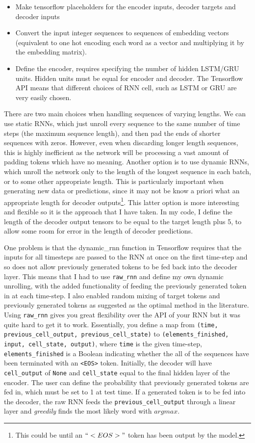 \documentclass[]{article}
\begin{document}
\begin{itemize}
	\item Make tensorflow placeholders for the encoder inputs, decoder targets and decoder inputs
	\item Convert the input integer sequences to sequences of embedding vectors (equivalent to one hot encoding each word as a vector and multiplying it by the embedding matrix).
	\item Define the encoder, requires specifying the number of hidden LSTM/GRU units. Hidden units must be equal for encoder and decoder. The Tensorflow API means that different choices of RNN cell, such as LSTM or GRU are very easily chosen.
\end{itemize}
There are two main choices when handling sequences of varying lengths. We can use static RNNs, which just unroll every sequence to the same number of time steps (the maximum sequence length), and then pad the ends of shorter sequences with zeros. However, even when discarding longer length sequences, this is highly inefficient as the network will be processing a vast amount of padding tokens which have no meaning. Another option is to use dynamic RNNs, which unroll the network only to the length of the longest sequence in each batch, or to some other appropriate length. This is particularly important when generating new data or predictions, since it may not be know a priori what an appropriate length for decoder outputs\footnote{This could be until an $``<EOS>"$ token has been output by the model.}. This latter option is more interesting and flexible so it is the approach that I have taken. In my code, I define the length of the decoder output tensors to be equal to the target length plus 5, to allow some room for error in the length of decoder predictions.

One problem is that the dynamic\_rnn function in Tensorflow requires that the inputs for all timesteps are passed to the RNN at once on the first time-step and so does not allow previously generated tokens to be fed back into the decoder layer. This means that I had to use \lstinline{raw_rnn} and define my own dynamic unrolling, with the added functionality of feeding the previously generated token in at each time-step. I also enabled random mixing of target tokens and previously generated tokens as suggested as the optimal method in the literature. Using \lstinline{raw_rnn} gives you great flexibility over the API of your RNN but it was quite hard to get it to work. Essentially, you define a map from \lstinline{(time, previous_cell_output, previous_cell_state)}
to \lstinline{(elements_finished, input, cell_state, output)}, where \lstinline{time} is the given time-step, \lstinline{elements_finished} is a Boolean indicating whether the all of the sequences have been terminated with an \lstinline{<EOS>} token. Initially, the decoder will have \lstinline{cell_output} of \lstinline{None} and \lstinline{cell_state} equal to the final hidden layer of the encoder. The user can define the probability that previously generated tokens are fed in, which must be set to 1 at test time. If a generated token is to be fed into the decoder, the raw RNN feeds the \lstinline{previous_cell_output} through a linear layer and \textit{greedily} finds the most likely word with $argmax$.
\end{document}
